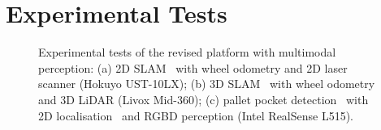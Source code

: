 \documentclass[letterpaper,10pt,conference]{IEEEtran} %
\begin{document}
\section{Experimental Tests}

\begin{figure}[t]
\centering
{}
\hspace{1em}
\hspace{1em}
\caption{Experimental tests of the revised platform
with multimodal perception:
(a) 2D SLAM~\cite{macenski2021joss}
with wheel odometry and 2D laser scanner (Hokuyo UST-10LX);
(b) 3D SLAM~\cite{aguiar2023vineslam}
with wheel odometry and 3D LiDAR (Livox Mid-360);
(c) pallet pocket detection~\cite{caldana2024robot}
with 2D localisation~\cite{sobreira2019jint} and
RGBD perception (Intel RealSense L515).}
\label{fig:results}
\end{figure}
\end{document}

